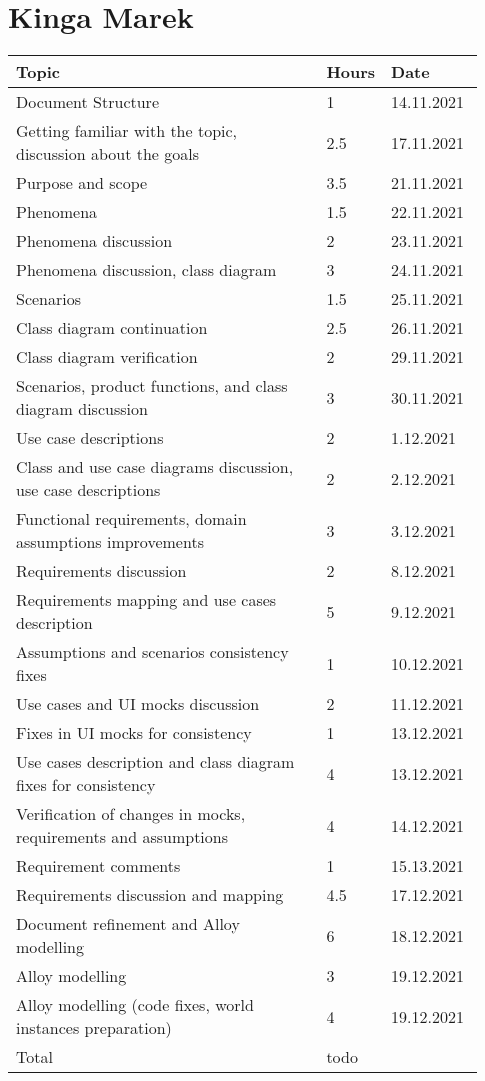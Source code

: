 \section*{Kinga Marek}
\begin{longtable}{@{}p{0.67\linewidth} p{0.06\linewidth} p{0.20\linewidth}@{}}
    \toprule[1.5pt]
    Topic &  Hours & Date \\ \hline
    Document Structure & 1 & 14.11.2021 \\ 
    Getting familiar with the topic, discussion about the goals & 2.5 & 17.11.2021 \\ 
    Purpose and scope & 3.5 & 21.11.2021 \\
    Phenomena & 1.5 & 22.11.2021 \\ 
    Phenomena discussion & 2 & 23.11.2021 \\
    Phenomena discussion, class diagram & 3 & 24.11.2021 \\ 
    Scenarios & 1.5 & 25.11.2021 \\ 
    Class diagram continuation & 2.5 & 26.11.2021 \\
    Class diagram verification & 2 & 29.11.2021 \\
    Scenarios, product functions, and class diagram discussion & 3 & 30.11.2021\\ 
    Use case descriptions & 2 & 1.12.2021\\
    Class and use case diagrams discussion, use case descriptions & 2 & 2.12.2021\\
    Functional requirements, domain assumptions improvements & 3 & 3.12.2021\\
    Requirements discussion & 2 & 8.12.2021\\
    Requirements mapping and use cases description & 5 & 9.12.2021\\
    Assumptions and scenarios consistency fixes & 1 & 10.12.2021\\
    Use cases and UI mocks discussion & 2 & 11.12.2021\\
    Fixes in UI mocks for consistency & 1 & 13.12.2021\\
    Use cases description and class diagram fixes for consistency & 4 & 13.12.2021\\
    Verification of changes in mocks, requirements and assumptions & 4 & 14.12.2021\\
    Requirement comments & 1 & 15.13.2021 \\
    Requirements discussion and mapping & 4.5 & 17.12.2021\\
    Document refinement and Alloy modelling & 6 & 18.12.2021\\
    Alloy modelling & 3 & 19.12.2021\\
    Alloy modelling (code fixes, world instances preparation) & 4 & 19.12.2021\\
    \hline
    Total & todo & \\ 
    \bottomrule[1.5pt]
\end{longtable}